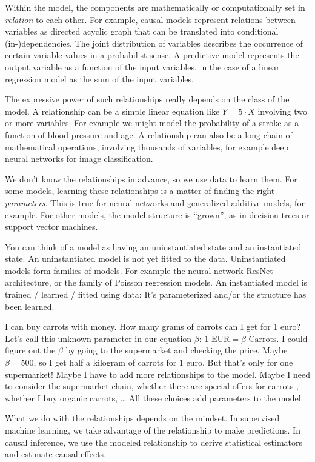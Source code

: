 \documentclass[
  10pt,
]{scrbook}
\begin{document}
Within the model, the components are mathematically or computationally set in \emph{relation} to each other.
For example, causal models represent relations between variables as directed acyclic graph that can be translated into conditional (in-)dependencies.
The joint distribution of variables describes the occurrence of certain variable values in a probabilist sense.
A predictive model represents the output variable as a function of the input variables, in the case of a linear regression model as the sum of the input variables.

The expressive power of such relationships really depends on the class of the model.
A relationship can be a simple linear equation like \(Y = 5 \cdot X\) involving two or more variables.
For example we might model the probability of a stroke as a function of blood pressure and age.
A relationship can also be a long chain of mathematical operations, involving thousands of variables, for example deep neural networks for image classification.

We don't know the relationships in advance, so we use data to learn them.
For some models, learning these relationships is a matter of finding the right \emph{parameters}.
This is true for neural networks and generalized additive models, for example.
For other models, the model structure is ``grown'', as in decision trees or support vector machines.

You can think of a model as having an uninstantiated state and an instantiated state.
An uninstantiated model is not yet fitted to the data.
Uninstantiated models form families of models.
For example the neural network ResNet architecture, or the family of Poisson regression models.
An instantiated model is trained / learned / fitted using data: It's parameterized and/or the structure has been learned.

I can buy carrots with money.
How many grams of carrots can I get for 1 euro?
Let's call this unknown parameter in our equation \(\beta\):
\(1 \text{ EUR} = \beta \text{ Carrots}\).
I could figure out the \(\beta\) by going to the supermarket and checking the price.
Maybe \(\beta = 500\), so I get half a kilogram of carrots for 1 euro.
But that's only for one supermarket!
Maybe I have to add more relationships to the model.
Maybe I need to consider the supermarket chain, whether there are special offers for carrots , whether I buy organic carrots, \ldots{}
All these choices add parameters to the model.

What we do with the relationships depends on the mindset.
In supervised machine learning, we take advantage of the relationship to make predictions.
In causal inference, we use the modeled relationship to derive statistical estimators and estimate causal effects.
\end{document}
